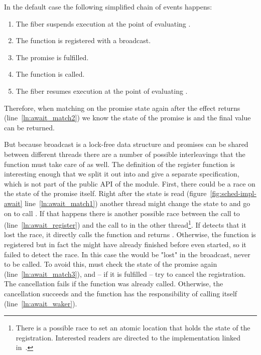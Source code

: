In the default case the following simplified chain of events happens:
\begin{enumerate}
  \item The fiber suspends execution at the point of evaluating .
  \item The  function is registered with a broadcast.
  \item The promise is fulfilled.
  \item The  function is called.
  \item The fiber resumes execution at the point of evaluating .
\end{enumerate}
Therefore, when matching on the promise state again after the \esuspend{} effect returns (line~\ref{ln:await_match2}) we know the state of the promise is  and the final value can be returned.

But because broadcast is a lock-free data structure and promises can be shared between different threads there are a number of possible interleavings that the  function must take care of as well.
The definition of the register function is interesting enough that we split it out into  and give a separate specification, which is not part of the public API of the module.
First, there could be a race on the state of the promise itself.
Right after the state is read (figure~\ref{fig:sched-impl-await} line~\ref{ln:await_match1}) another thread might change the state to  and go on to call .
If that happens there is another possible race between the call to  (line~\ref{ln:await_register}) and the call to  in the other thread\footnote{There is a possible race to set an atomic location that holds the state of the registration. Interested readers are directed to the implementation linked in~\cite{koval2023cqs}.}.
If  detects that it lost the race, it directly calls the  function and returns .
Otherwise, the  function is registered but in fact the  might have already finished before  even started, so it failed to detect the race.
In this case the  would be "lost" in the broadcast, never to be called.
To avoid this,  must check the state of the promise again (line~\ref{ln:await_match3}), and -- if it is fulfilled -- try to cancel the  registration.
The cancellation fails if the  function was already called.
Otherwise, the cancellation succeeds and the  function has the responsibility of calling  itself (line~\ref{ln:await_waker}).


